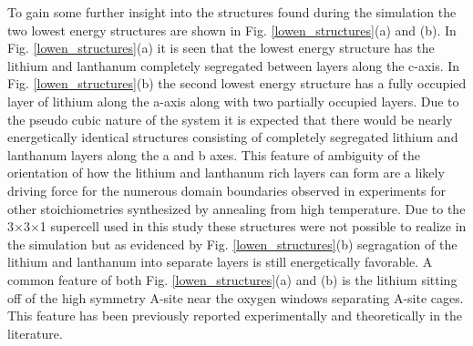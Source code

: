 \documentclass[aps,pre,reprint,superscriptaddress,showkeys]{revtex4-1}
\begin{document}
To gain some further insight into the structures found during the simulation the two lowest energy structures are  shown in  Fig. \ref{lowen_structures}(a) and (b). In Fig. \ref{lowen_structures}(a) it is seen that the lowest energy structure has the lithium and lanthanum completely segregated between layers along the c-axis. In Fig. \ref{lowen_structures}(b)  the second lowest energy structure has a fully occupied layer of lithium along the a-axis along with two partially occupied layers.  Due to the pseudo cubic nature of the system it is expected that there would be nearly energetically identical structures  consisting of completely segregated lithium and lanthanum layers along the a and b axes. This feature of ambiguity of the orientation of how the lithium and lanthanum rich layers can form  are a likely driving force for the numerous domain boundaries observed in experiments for other stoichiometries synthesized by annealing from high temperature\cite{imaginary_phonons,domainboundaries}. Due to the 3$\times$3$\times$1 supercell used in this study these structures were not possible to realize in the simulation but as evidenced by Fig. \ref{lowen_structures}(b) segragation of the lithium and lanthanum into separate layers is still energetically favorable. A common feature of both Fig. \ref{lowen_structures}(a) and (b) is the lithium sitting off of the high symmetry A-site near the oxygen windows separating A-site cages. This feature has been previously reported experimentally and theoretically in the literature\cite{Asitedistribution,imaginary_phonons,Li_La_ordering_computational,lithiumpos}. 
\\
\end{document}
